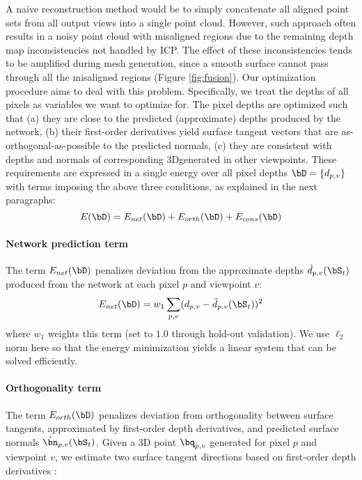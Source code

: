 \documentclass[10pt, conference, compsocconf]{IEEEtran}
\begin{document}
A naive reconstruction method would be to simply concatenate all aligned point sets   from all output views into a single point cloud. However, such approach often results in a  noisy point cloud with misaligned regions due to the remaining depth map inconsistencies not handled by ICP. The effect of these inconsistencies tends to be amplified during mesh generation, since  a smooth surface cannot pass through all the misaligned regions (Figure \ref{fig:fusion}). Our optimization procedure aims to deal with this problem. 
Specifically, we treat the depths of all  pixels 
 as variables we want to optimize for. The pixel depths are optimized such that (a) they are  close to the  predicted (approximate) depths produced by the network,  (b) their first-order  derivatives  yield surface tangent vectors that are as-orthogonal-as-possible to the predicted normals, (c) they are consistent with depths and normals of  corresponding 3D\points generated  in other viewpoints. These  requirements are expressed in a single energy over all pixel depths $\bD = \{d_{p,v}\}$ with terms imposing the above three conditions, as explained in the next paragraphs:
\vspace{-1mm}\begin{equation}
E(\bD) =E_{net}(\bD) + E_{orth}(\bD) + E_{cons}(\bD) \nonumber
\end{equation}\vspace{-3mm}\paragraph{Network prediction term} The  term $E_{net}(\bD)$ penalizes deviation from the approximate depths $\tilde{d}_{p,v}(\bS_t)$ produced from the network at  each pixel $p$ and viewpoint $v$:
\vspace{-1mm}\begin{equation}
E_{net}(\bD) = w_1 \sum\limits_{p,v} ( {d}_{p,v} - \tilde{d}_{p,v}(\bS_t) )^2 \nonumber
\end{equation}\vskip -5mm
where $w_1$ weights this term (set  to $1.0$ through hold-out validation). We use $\ell_2$  norm here so that the energy minimization yields a linear system that can be solved efficiently. \vspace{-5mm}\vspace{0mm}\paragraph{Orthogonality term} The term $E_{orth}(\bD)$ penalizes deviation from orthogonality between surface tangents, approximated by first-order depth derivatives, and predicted surface normals $\tilde{\bn}_{p,v}(\bS_t)$. Given a 3D point $\bq_{p,v}$ generated for pixel $p$ and viewpoint $v$, we  estimate two surface tangent directions based on  first-order depth  derivatives \cite{Nehab:2005:ECP}:
\end{document}
